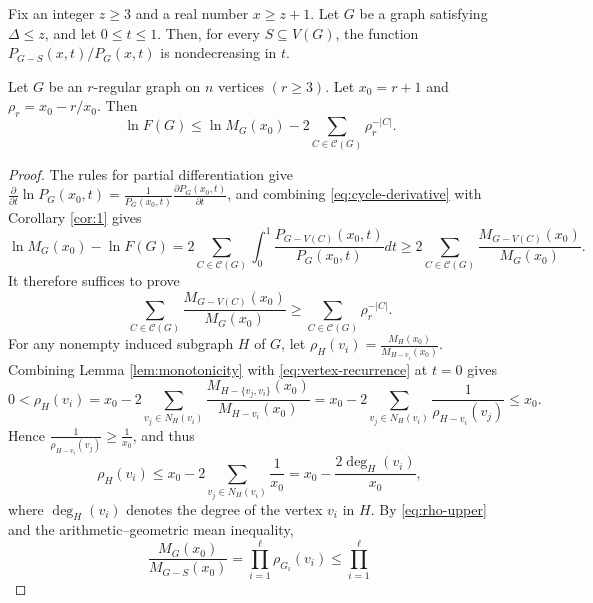 \documentclass[11pt, a4paper]{article}
\begin{document}
\begin{corollary}\label{cor:1}
Fix an integer $z\geq3$ and a real number $x\geq z+1$.
Let $G$ be a graph satisfying $\Delta \leq z$, and let $0\leq t\leq1$.
Then, for every $S\subseteq V(G)$, the function $P_{G-S}(x,t)/P_G(x,t)$ is nondecreasing in $t$.
\end{corollary}

\begin{lemma}\label{lemma:cycle-loss}
Let $G$ be an $r$-regular graph on $n$ vertices $(r\geq3)$. Let $x_0=r+1$ and
$\rho_r=x_0-r/x_0$.
Then
\begin{equation}\label{eq:cycle-loss}
 \ln F(G)
 \leq\ln M_G(x_0)-2\sum_{C\in\mathcal{C}(G)}\rho_r^{-|C|}.
\end{equation}
\end{lemma}
\begin{proof}
The rules for partial differentiation give
$\frac{\partial}{\partial t} \ln P_G(x_0,t) = \frac{1}{P_G(x_0,t)} \frac{\partial P_G(x_0,t)}{\partial t}$,
and combining \eqref{eq:cycle-derivative} with Corollary \ref{cor:1} gives
\begin{equation}\label{eq:loss-first}
\ln M_G(x_0) - \ln F(G) 
= 2 \sum_{C \in \mathcal{C}(G)} \int_0^1 
\frac{P_{G-V(C)}(x_0,t)}{P_G(x_0,t)} dt  
\ge 2 \sum_{C \in \mathcal{C}(G)} 
\frac{M_{G-V(C)}(x_0)}{M_G(x_0)}.
\end{equation}
It therefore suffices to prove
\begin{equation}\label{eq:25}
\sum_{C \in \mathcal{C}(G)} 
\frac{M_{G-V(C)}(x_0)}{M_G(x_0)}
\geq \sum_{C\in\mathcal{C}(G)}\rho_r^{-|C|}.
\end{equation}
For any nonempty induced subgraph $H$ of $G$,
let $\rho_H(v_i)=\frac{M_H(x_0)}{M_{H-v_i}(x_0)}$.
Combining Lemma \ref{lem:monotonicity} with \eqref{eq:vertex-recurrence} at $t=0$ gives
\[
 0<\rho_H(v_i)
 =x_0 - 2 \sum_{v_j\in N_H(v_i)} \frac{M_{H-\{v_j,v_i\}}(x_0)}{M_{H-v_i}(x_0)}
 =x_0-2\sum_{v_j\in N_H(v_i)}\frac1{\rho_{H-v_i}(v_j)}\leq x_0.
\]
Hence $\frac{1}{\rho_{H-v_i}(v_j)} \geq \frac{1}{x_0}$,
and thus
\begin{equation}\label{eq:rho-upper}
 \rho_H(v_i) \leq x_0 - 2 \sum_{v_j\in N_H(v_i)}\frac1{x_0} = x_0-\frac{2\deg_H(v_i)}{x_0},
\end{equation}
where $\deg_H(v_i)$ denotes the degree of the vertex $v_i$ in $H$.
By \eqref{eq:rho-upper} and the arithmetic--geometric mean inequality,
\begin{equation}
\frac{M_G(x_0)}{M_{G-S}(x_0)}
=
\prod_{i=1}^{\ell}\rho_{G_i}(v_i)
\leq
\prod_{i=1}^{\ell}

\end{equation}
\end{proof}
\end{document}
